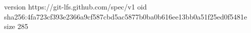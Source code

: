 version https://git-lfs.github.com/spec/v1
oid sha256:4fa723cf393e2366a9cf587cbd5ac5877b0ba0b616ee13bb0a51f25ed0f5481e
size 285
